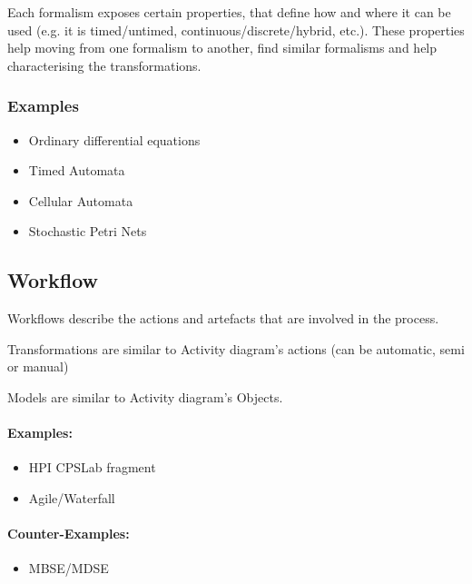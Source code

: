 \begin{definition}
    Each formalism exposes certain properties, that define how and where it can be used (e.g. it is timed/untimed, continuous/discrete/hybrid, etc.).
    These properties help moving from one formalism to another, find similar formalisms and help characterising the transformations.
\end{definition}


\subsubsection{Examples}
\label{sec:Formalism-Examples}

\begin{itemize}
    \item Ordinary differential equations
    \item Timed Automata
    \item Cellular Automata
    \item Stochastic Petri Nets
\end{itemize}


\subsection{Workflow}
\label{sec:Workflow}
Workflows describe the actions and artefacts that are involved in the process.

Transformations are similar to Activity diagram's actions (can be automatic, semi or manual)

Models are similar to Activity diagram's Objects.

\paragraph{Examples:}


\begin{itemize}
    \item HPI CPSLab fragment
    \item Agile/Waterfall
\end{itemize}

\paragraph{Counter-Examples:}
\begin{itemize}
    \item MBSE/MDSE
\end{itemize}


